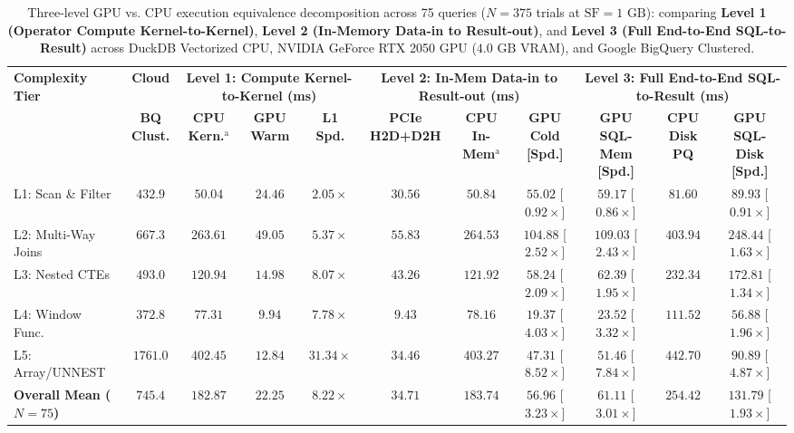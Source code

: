\documentclass[10pt,a4paper]{article}
\begin{document}
\begin{table}[!t]
\centering
\caption{Three-level GPU vs. CPU execution equivalence decomposition across 75 queries ($N=375$ trials at $\text{SF}=1\text{ GB}$): comparing \textbf{Level 1 (Operator Compute Kernel-to-Kernel)}, \textbf{Level 2 (In-Memory Data-in to Result-out)}, and \textbf{Level 3 (Full End-to-End SQL-to-Result)} across DuckDB Vectorized CPU, NVIDIA GeForce RTX 2050 GPU ($4.0\text{ GB}$ VRAM), and Google BigQuery Clustered.}
\label{tab:gpu_pcie_decomposition}
\scriptsize
\setlength{\tabcolsep}{2.9pt}
\renewcommand{\arraystretch}{1.12}
\begin{tabular}{@{}lcccccccccc@{}}
\toprule
\multirow{2}{*}{\textbf{Complexity Tier}} & \textbf{Cloud} & \multicolumn{3}{c}{\textbf{Level 1: Compute Kernel-to-Kernel (ms)}} & \multicolumn{3}{c}{\textbf{Level 2: In-Mem Data-in to Result-out (ms)}} & \multicolumn{3}{c}{\textbf{Level 3: Full End-to-End SQL-to-Result (ms)}} \\
\cmidrule(lr){2-2} \cmidrule(lr){3-5} \cmidrule(lr){6-8} \cmidrule(lr){9-11}
 & \textbf{BQ Clust.} & \textbf{CPU Kern.$^{\text{a}}$} & \textbf{GPU Warm} & \textbf{L1 Spd.} & \textbf{PCIe H2D+D2H} & \textbf{CPU In-Mem$^{\text{a}}$} & \textbf{GPU Cold [Spd.]} & \textbf{GPU SQL-Mem [Spd.]} & \textbf{CPU Disk PQ} & \textbf{GPU SQL-Disk [Spd.]} \\
\midrule
L1: Scan \& Filter & $432.9$ & $50.04$ & $24.46$ & $2.05\times$ & $30.56$ & $50.84$ & $55.02$ [$0.92\times$] & $59.17$ [$0.86\times$] & $81.60$ & $89.93$ [$0.91\times$] \\
L2: Multi-Way Joins & $667.3$ & $263.61$ & $49.05$ & $5.37\times$ & $55.83$ & $264.53$ & $104.88$ [$2.52\times$] & $109.03$ [$2.43\times$] & $403.94$ & $248.44$ [$1.63\times$] \\
L3: Nested CTEs & $493.0$ & $120.94$ & $14.98$ & $8.07\times$ & $43.26$ & $121.92$ & $58.24$ [$2.09\times$] & $62.39$ [$1.95\times$] & $232.34$ & $172.81$ [$1.34\times$] \\
L4: Window Func. & $372.8$ & $77.31$ & $9.94$ & $7.78\times$ & $9.43$ & $78.16$ & $19.37$ [$4.03\times$] & $23.52$ [$3.32\times$] & $111.52$ & $56.88$ [$1.96\times$] \\
L5: Array/UNNEST & $1761.0$ & $402.45$ & $12.84$ & $31.34\times$ & $34.46$ & $403.27$ & $47.31$ [$8.52\times$] & $51.46$ [$7.84\times$] & $442.70$ & $90.89$ [$4.87\times$] \\
\midrule
\textbf{Overall Mean ($N=75$)} & $\mathbf{745.4}$ & $\mathbf{182.87}$ & $\mathbf{22.25}$ & $\mathbf{8.22\times}$ & $\mathbf{34.71}$ & $\mathbf{183.74}$ & $\mathbf{56.96}$ [$\mathbf{3.23\times}$] & $\mathbf{61.11}$ [$\mathbf{3.01\times}$] & $\mathbf{254.42}$ & $\mathbf{131.79}$ [$\mathbf{1.93\times}$] \\

\end{tabular}
\end{table}
\end{document}
